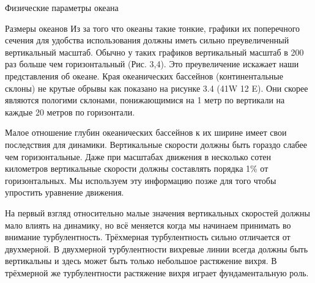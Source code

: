 \begin{chapter}{Физические параметры океана}
\begin{section}{Размеры океанов}
Из за того что океаны такие тонкие, графики их поперечного сечения для
удобства использования должны иметь сильно преувеличенный вертикальный
масштаб. Обычно у таких графиков вертикальный масштаб в 200 раз больше
чем горизонтальный (Рис. 3,4). Это преувеличение искажает наши
представления об океане. Края океанических бассейнов (континентальные
склоны) не крутые обрывы как показано на рисунке 3.4 (41W 12 E). Они
скорее являются пологими склонами, понижающимися на 1 метр по
вертикали на каждые 20 метров по горизонтали.
%

Малое отношение глубин океанических бассейнов к их ширине имеет свои
последствия для динамики. Вертикальные скорости должны быть гораздо
слабее чем горизонтальные. Даже при масштабах движения в несколько
сотен километров вертикальные скорости должны составлять порядка 1\%
от горизонтальных. Мы используем эту информацию позже для того чтобы
упростить уравнение движения.
%

На первый взгляд относительно малые значения вертикальных скоростей
должны мало влиять на динамику, но всё меняется когда мы начинаем
принимать во внимание турбулентность. Трёхмерная турбулентность сильно
отличается от двухмерной. В двухмерной турбулентности вихревые линии
всегда должны быть вертикальны и здесь может быть только небольшое
растяжение вихря. В трёхмерной же турбулентности растяжение вихря
играет фундаментальную роль.
%


\end{section}
\end{chapter}
